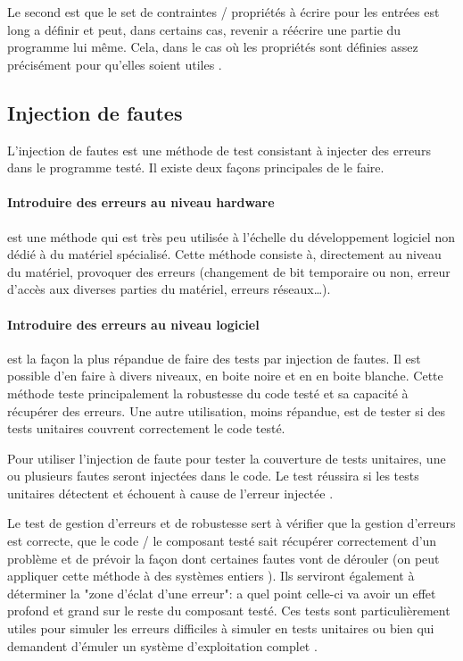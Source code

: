 \documentclass[a4paper]{report}
\begin{document}
Le second est que le set de contraintes / propriétés à écrire pour les entrées est long a définir et peut, dans certains cas, revenir  a réécrire une partie du programme lui même.
Cela, dans le cas où les propriétés sont définies assez précisément pour qu'elles soient utiles \cite{Papadakis2011}.

\subsection{Injection de fautes}

L'injection de fautes est une méthode de test consistant à injecter des erreurs dans le programme testé.
Il existe deux façons principales de le faire.


\paragraph{Introduire des erreurs au niveau hardware} est une méthode qui est très peu utilisée à l'échelle du développement logiciel non dédié à du matériel spécialisé.
Cette méthode consiste à, directement au niveau du matériel, provoquer des erreurs (changement de bit temporaire ou non, erreur d'accès aux diverses parties du matériel, erreurs réseaux…)\cite{Avresky1996}.

\paragraph{Introduire des erreurs au niveau logiciel} est la façon la plus répandue de faire des tests par injection de fautes.
Il est possible d'en faire à divers niveaux, en boite noire et en en boite blanche.
Cette méthode teste principalement la robustesse du code testé et sa capacité à récupérer des erreurs.
Une autre utilisation, moins répandue, est de tester si des tests unitaires couvrent correctement le code testé.

Pour utiliser l'injection de faute pour tester la couverture de tests unitaires, une ou plusieurs fautes seront injectées dans le code.
Le test réussira si les tests unitaires détectent et échouent à cause de l'erreur injectée \cite{Segall}.

Le test de gestion d'erreurs et de robustesse sert à vérifier que la gestion d'erreurs est correcte, que le code / le composant testé sait récupérer correctement d'un problème et de prévoir la façon dont certaines fautes vont de dérouler \cite{Avresky1996} (on peut appliquer cette méthode à des systèmes entiers \cite{Lenka2018}).
Ils serviront également à déterminer la "zone d'éclat d'une erreur": a quel point celle-ci va avoir un effet profond et grand sur le reste du composant testé.
Ces tests sont particulièrement utiles pour simuler les erreurs difficiles à simuler en tests unitaires ou bien qui demandent d'émuler un système d'exploitation complet \cite{Marinescu2011}.
\end{document}
